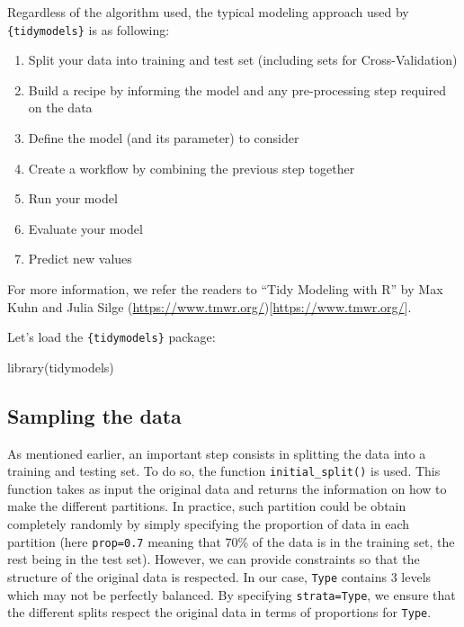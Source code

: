\documentclass[
]{krantz}
\makeatletter
\newenvironment{Shaded}{\begin{snugshade}}{\end{snugshade}}
\newcommand{\FunctionTok}[1]{\textcolor[rgb]{0,0,0}{#1}}
\newcommand{\NormalTok}[1]{#1}
\providecommand{\tightlist}{%
  \setlength{\itemsep}{0pt}\setlength{\parskip}{0pt}}
\newenvironment{kframe}{%
\medskip{}
\setlength{\fboxsep}{.8em}
 \def\at@end@of@kframe{}%
 \ifinner\ifhmode%
  \def\at@end@of@kframe{\end{minipage}}%
  \begin{minipage}{\columnwidth}%
 \fi\fi%
 \def\FrameCommand##1{\hskip\@totalleftmargin \hskip-\fboxsep
 \colorbox{shadecolor}{##1}\hskip-\fboxsep
     \hskip-\linewidth \hskip-\@totalleftmargin \hskip\columnwidth}%
 \MakeFramed {\advance\hsize-\width
   \@totalleftmargin\z@ \linewidth\hsize
   \@setminipage}}%
 {\par\unskip\endMakeFramed%
 \at@end@of@kframe}
\renewenvironment{Shaded}{\begin{kframe}}{\end{kframe}}
\makeatother
\begin{document}
Regardless of the algorithm used, the typical modeling approach used by \texttt{\{tidymodels\}} is as following:

\begin{enumerate}
\def\labelenumi{\arabic{enumi}.}
\tightlist
\item
  Split your data into training and test set (including sets for Cross-Validation)
\item
  Build a recipe by informing the model and any pre-processing step required on the data
\item
  Define the model (and its parameter) to consider
\item
  Create a workflow by combining the previous step together
\item
  Run your model
\item
  Evaluate your model
\item
  Predict new values
\end{enumerate}

For more information, we refer the readers to ``Tidy Modeling with R'' by Max Kuhn and Julia Silge (\url{https://www.tmwr.org/}){[}\url{https://www.tmwr.org/}{]}.

Let's load the \texttt{\{tidymodels\}} package:

\begin{Shaded}
\begin{Highlighting}[]
\FunctionTok{library}\NormalTok{(tidymodels)}
\end{Highlighting}
\end{Shaded}

\hypertarget{sampling-the-data}{%
\subsection{Sampling the data}\label{sampling-the-data}}

As mentioned earlier, an important step consists in splitting the data into a training and testing set. To do so, the function \texttt{initial\_split()} is used. This function takes as input the original data and returns the information on how to make the different partitions. In practice, such partition could be obtain completely randomly by simply specifying the proportion of data in each partition (here \texttt{prop=0.7} meaning that 70\% of the data is in the training set, the rest being in the test set). However, we can provide constraints so that the structure of the original data is respected. In our case, \texttt{Type} contains 3 levels which may not be perfectly balanced. By specifying \texttt{strata=Type}, we ensure that the different splits respect the original data in terms of proportions for \texttt{Type}.
\end{document}
